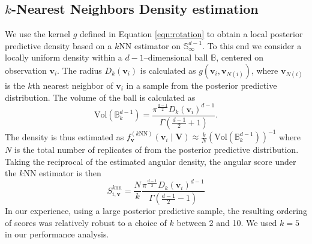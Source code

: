 
\subsection{$k$-Nearest Neighbors Density estimation}
We use the kernel $g$ defined in Equation \ref{eqn:rotation} to obtain 
    a local posterior predictive density based on a $k$NN estimator 
    on $\mathbb{S}_{\infty}^{d-1}$. To this end we consider a locally 
    uniform density within a $d-1$--dimensional ball $\mathbb{B}$, centered on 
    observation $\bm{v}_i$.  The radius $D_{k}(\bm{v}_i)$ is calculated as 
    $g(\bm{v}_i, \bm{v}_{N(i)})$, where $\bm{v}_{N(i)}$ is the $k$th nearest 
    neighbor of $\bm{v}_i$ in a sample from the 
    posterior predictive distribution. The volume of the ball is calculated as
    \begin{equation}
        \label{eqn:vol_sphere}
        \text{Vol}(\mathbb{B}_k^{d-1}) =
        \frac{\pi^{\frac{d-1}{2}}D_{k}(\bm{v}_i)^{d-1}}{
            \Gamma\left(\frac{d-1}{2} + 1\right)}.
    \end{equation}
    The density is thus estimated as 
    $f_{\bm{v}}^{(k\text{NN})}(\bm{v}_i\mid \bm{V}) \approx 
        \frac{k}{N}\left(\text{Vol}(\mathbb{B}_{k}^{d-1})\right)^{-1}$
    where $N$ is the total number of replicates of from the posterior predictive
    distribution.  Taking the reciprocal of the estimated angular density, 
    the angular score under the $k$NN estimator is then
    \begin{equation}
        \label{eqn:ad_knn_h}
        S_{i,\bm{v}}^{\text{$k$nn}} = \frac{N}{k}
            \frac{\pi^{\frac{d-1}{2}}D_{k}(\bm{v}_i)^{d-1}}{
            \Gamma\left(\frac{d-1}{2} - 1\right)}
    \end{equation}
    In our experience, using a large posterior predictive sample, 
    the resulting ordering of scores was relatively robust to a choice of $k$ 
    between 2 and 10.  We used $k = 5$ in our performance analysis.
